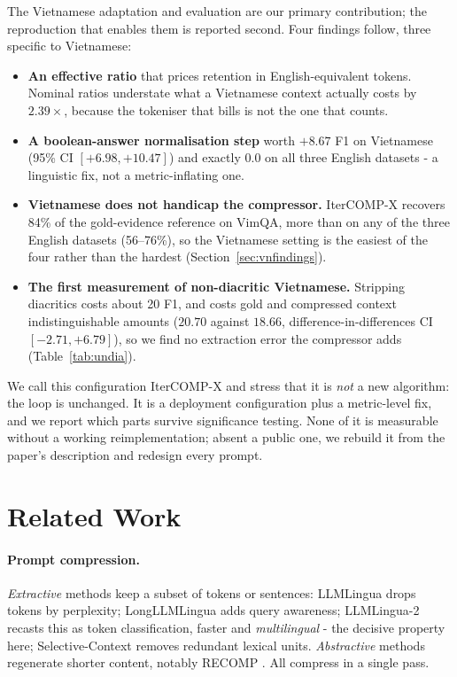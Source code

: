 \documentclass{llncs}
\begin{document}
The Vietnamese adaptation and evaluation are our primary contribution; the
reproduction that enables them is reported second. Four findings follow, three
specific to Vietnamese:

\begin{itemize}[leftmargin=1.2em, itemsep=0pt, parsep=0pt, topsep=2pt,
                partopsep=0pt]
\item \textbf{An effective ratio} that prices retention in English-equivalent
  tokens. Nominal ratios understate what a Vietnamese context actually costs by
  $2.39\times$, because the tokeniser that bills is not the one that counts.
\item \textbf{A boolean-answer normalisation step} worth $+8.67$ F1 on
  Vietnamese (95\% CI $[+6.98,+10.47]$) and exactly $0.0$ on all three English
  datasets - a linguistic fix, not a metric-inflating one.
\item \textbf{Vietnamese does not handicap the compressor.}
  IterCOMP-X recovers 84\% of the gold-evidence reference on VimQA, more than on any of
  the three English datasets (56--76\%), so the Vietnamese setting is the
  easiest of the four rather than the hardest
  (Section~\ref{sec:vnfindings}).
\item \textbf{The first measurement of non-diacritic Vietnamese.} Stripping
  diacritics costs about 20 F1, and costs gold and compressed context
  indistinguishable amounts ($20.70$ against $18.66$, difference-in-differences
  CI $[-2.71,+6.79]$), so we find no extraction error the compressor adds
  (Table~\ref{tab:undia}).
\end{itemize}

We call this configuration IterCOMP-X and stress that it is \emph{not} a new
algorithm: the loop is unchanged. It is a deployment configuration plus a
metric-level fix, and we report which parts survive significance testing. None of
it is measurable without a working reimplementation; absent a public one, we
rebuild it from the paper's description and redesign every prompt.

\section{Related Work}
\label{sec:related}

\paragraph{Prompt compression.} \emph{Extractive} methods keep a subset of
tokens or sentences: LLMLingua \cite{jiang2023llmlingua} drops tokens by
perplexity; LongLLMLingua \cite{jiang2024longllmlingua} adds query awareness;
LLMLingua-2 \cite{pan2024llmlingua2} recasts this as token classification,
faster and \emph{multilingual} - the decisive property here; Selective-Context
\cite{li2023selectivecontext} removes redundant lexical units. \emph{Abstractive}
methods regenerate shorter content, notably RECOMP \cite{xu2024recomp}. All
compress in a single pass.
\end{document}
